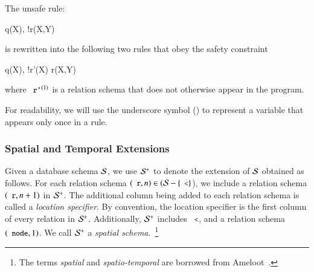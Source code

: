 \begin{example}
The unsafe rule:
\begin{Drules}
      {q(X), !r(X,Y)}
\end{Drules}
is rewritten into the following two rules that obey the safety constraint

\begin{Drules}
      {q(X), !r'(X)}
      {r(X,Y)}
\end{Drules}

where $\dedalus{r'}^{(1)}$ is a relation schema that does not otherwise appear in the program.
\end{example}

For readability, we will use the underscore symbol (\dedalus{_}) to represent a variable that appears only once in a rule.




\subsubsection{Spatial and Temporal Extensions}

Given a database schema $\schema$, we use $\sschema$ to denote the extension of $\schema$
obtained as follows. For each relation schema $(\dedalus{r}, n) \in (\schema-\{\dedalus{<}\}$), we include a relation schema $(\dedalus{r}, n+1)$ in $\sschema$. The
additional column being added to each relation schema is called a {\em location specifier}. By convention, the
location specifier is the first column of every relation in $\sschema$.
Additionally, $\sschema$ includes $\dedalus{<}$, and a relation schema $(\dedalus{node},1)$.
We call $\sschema$ a {\em spatial schema}.~\footnote{The terms {\em spatial} and
  {\em spatio-temporal} are borrowed from Ameloot~\cite{ameloot-personal}.}

